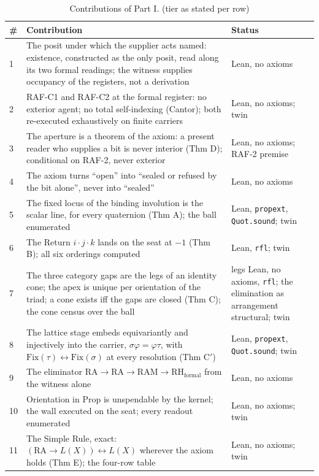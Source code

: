 \documentclass[10pt,twocolumn]{article}
\begin{document}
\begin{table}[t]
\footnotesize
\caption{Contributions of Part I. (tier as stated per row)}
\begin{tabular}{@{}p{}p{}p{}@{}}
\toprule
\# & Contribution & Status \\
\midrule
1 & The posit under which the supplier acts named: existence, constructed as the only posit, read along its two formal readings; the witness supplies occupancy of the registers, not a derivation & Lean, no axioms \\
2 & RAF-C1 and RAF-C2 at the formal register: no exterior agent; no total self-indexing (Cantor); both re-executed exhaustively on finite carriers & Lean, no axioms; twin \\
3 & The aperture is a theorem of the axiom: a present reader who supplies a bit is never interior (Thm D); conditional on RAF-2, never exterior & Lean, no axioms; RAF-2 premise \\
4 & The axiom turns “open” into “sealed or refused by the bit alone”, never into “sealed” & Lean, no axioms \\
5 & The fixed locus of the binding involution is the scalar line, for every quaternion (Thm A); the ball enumerated & Lean, \texttt{propext}, \texttt{Quot.sound}; twin \\
6 & The Return $i\cdot j\cdot k$ lands on the seat at $-1$ (Thm B); all six orderings computed & Lean, \texttt{rfl}; twin \\
7 & The three category gaps are the legs of an identity cone; the apex is unique per orientation of the triad; a cone exists iff the gaps are closed (Thm C); the cone census over the ball & legs Lean, no axioms, \texttt{rfl}; the elimination as arrangement structural; twin \\
8 & The lattice stage embeds equivariantly and injectively into the carrier, $\sigma\varphi = \varphi\tau$, with $\mathrm{Fix}(\tau) \leftrightarrow \mathrm{Fix}(\sigma)$ at every resolution (Thm C$'$) & Lean, \texttt{propext}, \texttt{Quot.sound}; twin \\
9 & The eliminator $\mathrm{RA} \to \mathrm{RA} \to \mathrm{RAM} \to \mathrm{RH}_{\mathrm{formal}}$ from the witness alone & Lean, no axioms \\
10 & Orientation in Prop is unspendable by the kernel; the wall executed on the seat; every readout enumerated & Lean, no axioms; twin \\
11 & The Simple Rule, exact: $(\mathrm{RA}\to L(X)) \leftrightarrow L(X)$ wherever the axiom holds (Thm E); the four-row table & Lean, no axioms; twin \\

\end{tabular}
\end{table}
\end{document}

